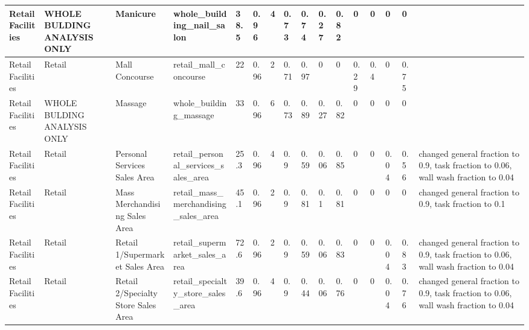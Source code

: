 \begin{center}
\begin{landscape}
\begin{longtable}{|p{0.75in}|p{0.75in}|p{0.75in}|p{0.75in}|p{0.3in}|p{0.3in}|p{0.3in}|p{0.3in}|p{0.3in}|p{0.3in}|p{0.3in}|p{0.3in}|p{0.3in}|p{0.3in}|p{0.3in}|p{0.6in}|}
      Retail Facilities                       & WHOLE BULDING ANALYSIS ONLY & Manicure                                        & whole\_building\_nail\_salon                                    & 38.5 & 0.96 & 4  & 0.73   & 0.74  & 0.27  & 0.82  & 0    & 0    & 0    & 0    &                                                                                       \\ \hline
      Retail Facilities                       & Retail                      & Mall Concourse                                  & retail\_mall\_concourse                                         & 22   & 0.96 & 2  & 0.71   & 0.97  & 0     & 0     & 0.29 & 0.4  & 0    & 0.75 &                                                                                       \\ \hline
      Retail Facilities                       & WHOLE BULDING ANALYSIS ONLY & Massage                                         & whole\_building\_massage                                        & 33   & 0.96 & 6  & 0.73   & 0.89  & 0.27  & 0.82  & 0    & 0    & 0    & 0    &                                                                                       \\ \hline
      Retail Facilities                       & Retail                      & Personal Services Sales Area                    & retail\_personal\_services\_sales\_area                         & 25.3 & 0.96 & 4  & 0.9    & 0.59  & 0.06  & 0.85  & 0    & 0    & 0.04 & 0.56 & changed general fraction to 0.9, task fraction to 0.06, wall wash fraction to 0.04  \\ \hline
      Retail Facilities                       & Retail                      & Mass Merchandising Sales Area                   & retail\_mass\_merchandising\_sales\_area                        & 45.1 & 0.96 & 2  & 0.9    & 0.81  & 0.1   & 0.81  & 0    & 0    & 0    & 0    & changed general fraction to 0.9, task fraction to 0.1                                 \\ \hline
      Retail Facilities                       & Retail                      & Retail 1/Supermarket Sales Area               & retail\_supermarket\_sales\_area                                & 72.6 & 0.96 & 2  & 0.9    & 0.59  & 0.06  & 0.83  & 0    & 0    & 0.04 & 0.83 & changed general fraction to 0.9, task fraction to 0.06, wall wash fraction to 0.04  \\ \hline
      Retail Facilities                       & Retail                      & Retail 2/Specialty Store Sales Area           & retail\_specialty\_store\_sales\_area                           & 39.6 & 0.96 & 4  & 0.9    & 0.44  & 0.06  & 0.76  & 0    & 0    & 0.04 & 0.76 & changed general fraction to 0.9, task fraction to 0.06, wall wash fraction to 0.04  \\ \hline

\end{longtable}
\end{landscape}
\end{center}
